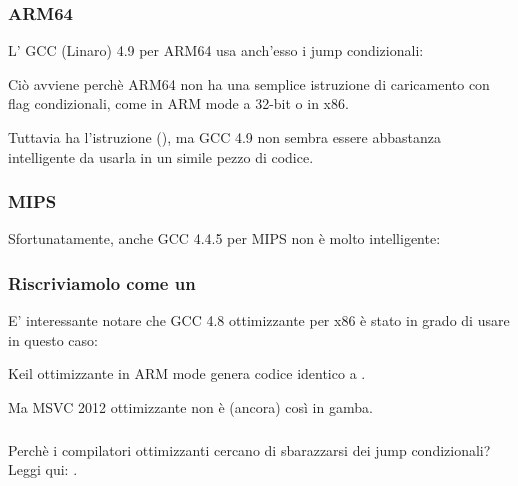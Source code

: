 

\subsubsection{ARM64}

L' \Optimizing GCC (Linaro) 4.9 per ARM64 usa anch'esso i jump condizionali:



Ciò avviene perchè ARM64 non ha una semplice istruzione di caricamento con flag condizionali, come  in ARM mode a 32-bit o  in x86.

Tuttavia ha l'istruzione  (),
ma GCC 4.9 non sembra essere abbastanza intelligente da usarla in un simile pezzo di codice.

\subsubsection{MIPS}

Sfortunatamente, anche GCC 4.4.5 per MIPS non è molto intelligente:



\subsubsection{Riscriviamolo come un }




E' interessante notare che GCC 4.8 ottimizzante per x86 è stato in grado di usare  in questo caso:



Keil ottimizzante in ARM mode genera codice identico a .

Ma MSVC 2012 ottimizzante non è (ancora) così in gamba.

\subsubsection{\Conclusion{}}

Perchè i compilatori ottimizzanti cercano di sbarazzarsi dei jump condizionali? Leggi qui: .
